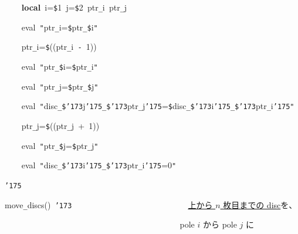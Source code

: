 \documentclass[a4paper,10pt]{article}
\def\mc{\relax}
\begin{document}
\noindent
\mbox{}{\tt\mc \ }{\tt\mc \ }{\tt\mc \ }{\tt\mc \ }\textbf{local}{\tt\mc \ }i={\tt\$}1{\tt\mc \ }j={\tt\$}2{\tt\mc \ }ptr{\tt\_}i{\tt\mc \ }ptr{\tt\_}j

\noindent
\mbox{}{\tt\mc \ }{\tt\mc \ }{\tt\mc \ }{\tt\mc \ }eval{\tt\mc \ }{\tt "}ptr{\tt\_}i={\tt{}}{\tt\$}ptr{\tt\_}{\tt\$}i{\tt "}

\noindent
\mbox{}{\tt\mc \ }{\tt\mc \ }{\tt\mc \ }{\tt\mc \ }ptr{\tt\_}i={\tt\$}((ptr{\tt\_}i{\tt\mc \ }{\tt -}{\tt\mc \ }1))

\noindent
\mbox{}{\tt\mc \ }{\tt\mc \ }{\tt\mc \ }{\tt\mc \ }eval{\tt\mc \ }{\tt "}ptr{\tt\_}{\tt\$}i={\tt\$}ptr{\tt\_}i{\tt "}

\noindent
\mbox{}{\tt\mc \ }{\tt\mc \ }{\tt\mc \ }{\tt\mc \ }eval{\tt\mc \ }{\tt "}ptr{\tt\_}j={\tt{}}{\tt\$}ptr{\tt\_}{\tt\$}j{\tt "}

\noindent
\mbox{}{\tt\mc \ }{\tt\mc \ }{\tt\mc \ }{\tt\mc \ }eval{\tt\mc \ }{\tt "}disc{\tt\_}{\tt\$}{\tt\char'173}j{\tt\char'175}{\tt\_}{\tt\$}{\tt\char'173}ptr{\tt\_}j{\tt\char'175}={\tt{}}{\tt\$}disc{\tt\_}{\tt\$}{\tt\char'173}i{\tt\char'175}{\tt\_}{\tt\$}{\tt\char'173}ptr{\tt\_}i{\tt\char'175}{\tt "}

\noindent
\mbox{}{\tt\mc \ }{\tt\mc \ }{\tt\mc \ }{\tt\mc \ }ptr{\tt\_}j={\tt\$}((ptr{\tt\_}j{\tt\mc \ }+{\tt\mc \ }1))

\noindent
\mbox{}{\tt\mc \ }{\tt\mc \ }{\tt\mc \ }{\tt\mc \ }eval{\tt\mc \ }{\tt "}ptr{\tt\_}{\tt\$}j={\tt\$}ptr{\tt\_}j{\tt "}

\noindent
\mbox{}{\tt\mc \ }{\tt\mc \ }{\tt\mc \ }{\tt\mc \ }eval{\tt\mc \ }{\tt "}disc{\tt\_}{\tt\$}{\tt\char'173}i{\tt\char'175}{\tt\_}{\tt\$}{\tt\char'173}ptr{\tt\_}i{\tt\char'175}=0{\tt "}

\noindent
\mbox{}{\tt\char'175}

\noindent
\mbox{}\hfill

\noindent
\mbox{}move{\tt\_}discs(){\tt\mc \ }{\tt\char'173}{\tt\mc \ }{\tt\mc \ }{\tt\mc \ }{\tt\mc \ }{\tt\mc \ }{\tt\mc \ }{\tt\mc \ }{\tt\mc \ }{\tt\mc \ }{\tt\mc \ }{\tt\mc \ }{\tt\mc \ }{\tt\mc \ }{\tt\mc \ }{\tt\mc \ }{\tt\mc \ }{\tt\mc \ }{\tt\mc \ }{\tt\mc \ }{\tt\mc \ }{\tt\mc \ }{\tt\mc \ }{\tt\mc \ }{\tt\mc \ }{\tt\mc \ }{\tt\mc \ }\rm\mc {\tt\#} \ \underline{\textsf{上から $n$ 枚目までの disc}}を、\hfill 
\tt\mc 

\noindent
\mbox{}{\tt\mc \ }{\tt\mc \ }{\tt\mc \ }{\tt\mc \ }{\tt\mc \ }{\tt\mc \ }{\tt\mc \ }{\tt\mc \ }{\tt\mc \ }{\tt\mc \ }{\tt\mc \ }{\tt\mc \ }{\tt\mc \ }{\tt\mc \ }{\tt\mc \ }{\tt\mc \ }{\tt\mc \ }{\tt\mc \ }{\tt\mc \ }{\tt\mc \ }{\tt\mc \ }{\tt\mc \ }{\tt\mc \ }{\tt\mc \ }{\tt\mc \ }{\tt\mc \ }{\tt\mc \ }{\tt\mc \ }{\tt\mc \ }{\tt\mc \ }{\tt\mc \ }{\tt\mc \ }{\tt\mc \ }{\tt\mc \ }{\tt\mc \ }{\tt\mc \ }{\tt\mc \ }{\tt\mc \ }{\tt\mc \ }{\tt\mc \ }\rm\mc {\tt\#} \ pole $i$ から pole $j$ に\hfill 
\tt\mc 
\end{document}
